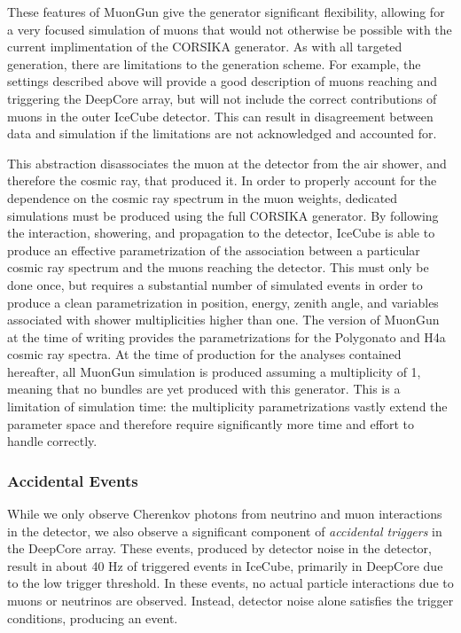 These features of MuonGun give the generator significant flexibility, allowing for a very focused simulation of muons that would not otherwise be possible with the current implimentation of the CORSIKA generator.
As with all targeted generation, there are limitations to the generation scheme.
For example, the settings described above will provide a good description of muons reaching and triggering the DeepCore array, but will not include the correct contributions of muons in the outer IceCube detector.
This can result in disagreement between data and simulation if the limitations are not acknowledged and accounted for.

This abstraction disassociates the muon at the detector from the air shower, and therefore the cosmic ray, that produced it.
In order to properly account for the dependence on the cosmic ray spectrum in the muon weights, dedicated simulations must be produced using the full CORSIKA generator. 
By following the interaction, showering, and propagation to the detector, IceCube is able to produce an effective parametrization of the association between a particular cosmic ray spectrum and the muons reaching the detector.
This must only be done once, but requires a substantial number of simulated events in order to produce a clean parametrization in position, energy, zenith angle, and variables associated with shower multiplicities higher than one.
The version of MuonGun at the time of writing provides the parametrizations for the Polygonato \cite{Hoerandel-Polygonato} and H4a \cite{Gaisser-H4a} cosmic ray spectra. 
At the time of production for the analyses contained hereafter, all MuonGun simulation is produced assuming a multiplicity of 1, meaning that no bundles are yet produced with this generator.
This is a limitation of simulation time: the multiplicity parametrizations vastly extend the parameter space and therefore require significantly more time and effort to handle correctly.

\subsubsection{Accidental Events}
\label{subsubsec:noise_triggers}
While we only observe Cherenkov photons from neutrino and muon interactions in the detector, we also observe a significant component of \emph{accidental triggers} in the DeepCore array.
These events, produced by detector noise in the detector, result in about 40 Hz of triggered events in IceCube, primarily in DeepCore due to the low trigger threshold.
In these events, no actual particle interactions due to muons or neutrinos are observed.
Instead, detector noise alone satisfies the trigger conditions, producing an event.

